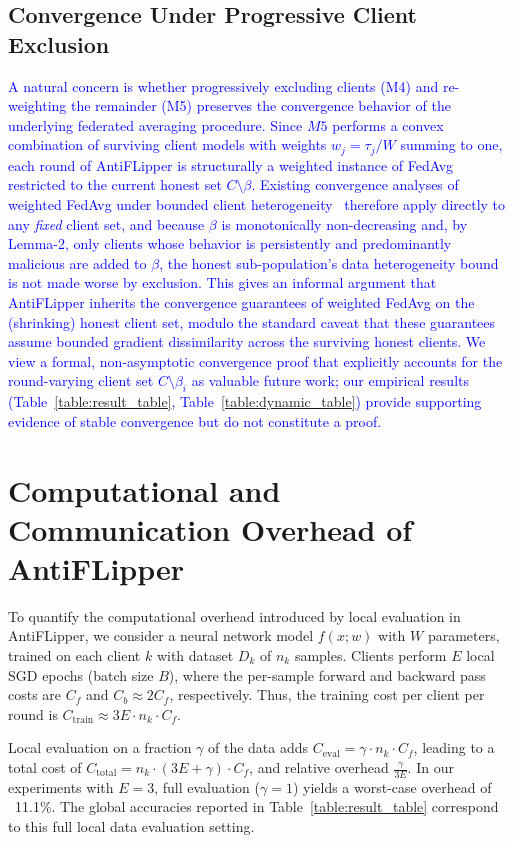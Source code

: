 \documentclass[conference]{IEEEtran}
\begin{document}
\subsection{Convergence Under Progressive Client Exclusion}
\textcolor{blue}{A natural concern is whether progressively excluding clients (M4) and re-weighting the remainder (M5) preserves the convergence behavior of the underlying federated averaging procedure. Since $M5$ performs a convex combination of surviving client models with weights $w_j = \tau_j / W$ summing to one, each round of AntiFLipper is structurally a weighted instance of FedAvg restricted to the current honest set $C \setminus \beta$. Existing convergence analyses of weighted FedAvg under bounded client heterogeneity~\cite{li2020convergence} therefore apply directly to any \emph{fixed} client set, and because $\beta$ is monotonically non-decreasing and, by Lemma-2, only clients whose behavior is persistently and predominantly malicious are added to $\beta$, the honest sub-population's data heterogeneity bound is not made worse by exclusion. This gives an informal argument that AntiFLipper inherits the convergence guarantees of weighted FedAvg on the (shrinking) honest client set, modulo the standard caveat that these guarantees assume bounded gradient dissimilarity across the surviving honest clients. We view a formal, non-asymptotic convergence proof that explicitly accounts for the round-varying client set $C \setminus \beta_i$ as valuable future work; our empirical results (Table~\ref{table:result_table}, Table~\ref{table:dynamic_table}) provide supporting evidence of stable convergence but do not constitute a proof.}


\section{Computational and Communication Overhead of AntiFLipper}
\label{sec:overhead}

To quantify the computational overhead introduced by local evaluation in {AntiFLipper}, we consider a neural network model $f(x; w)$ with $W$ parameters, trained on each client $k$ with dataset $D_k$ of $n_k$ samples. Clients perform $E$ local SGD epochs (batch size $B$), where the per-sample forward and backward pass costs are $C_f$ and $C_b \approx 2C_f$, respectively. Thus, the training cost per client per round is $C_{\text{train}} \approx 3E \cdot n_k \cdot C_f$.

Local evaluation on a fraction $\gamma$ of the data adds $C_{\text{eval}} = \gamma \cdot n_k \cdot C_f$, leading to a total cost of $C_{\text{total}} = n_k \cdot (3E + \gamma) \cdot C_f$, and relative overhead $\frac{\gamma}{3E}$. In our experiments with $E = 3$, full evaluation ($\gamma = 1$) yields a worst-case overhead of ~11.1\%. The global accuracies reported in Table~\ref{table:result_table} correspond to this full local data evaluation setting.
\end{document}
